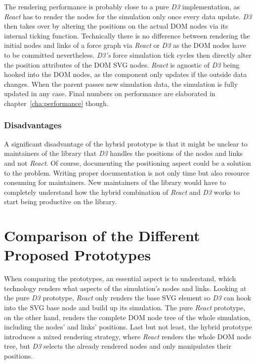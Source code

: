 The rendering performance is probably close to a pure \emph{D3} implementation, as \emph{React} has to render the nodes for the simulation only once every data update. \emph{D3} then takes over by altering the positions on the actual DOM nodes via its internal ticking function. Technically there is no difference between rendering the initial nodes and links of a force graph via \emph{React} or \emph{D3} as the DOM nodes have to be committed nevertheless. \emph{D3's} force simulation tick cycles then directly alter the position attributes of the DOM SVG nodes. \emph{React} is agnostic of \emph{D3} being hooked into the DOM nodes, as the component only updates if the outside data changes. When the parent passes new simulation data, the simulation is fully updated in any case. Final numbers on performance are elaborated in chapter~\ref{cha:performance} though.

\subsubsection{Disadvantages}
\label{subsub:hybridDisadvantages}

A sig\-nifi\-cant disadvantage of the hybrid prototype is that it might be unclear to maintainers of the library that \emph{D3} handles the positions of the nodes and links and not \emph{React}. Of course, documenting the positioning aspect could be a solution to the problem. Writing proper documentation is not only time but also resource consuming for maintainers. New maintainers of the library would have to completely understand how the hybrid combination of \emph{React} and \emph{D3} works to start being productive on the library.

\section{Comparison of the Different Proposed Prototypes}

When comparing the prototypes, an essential aspect is to understand, which technology renders what aspects of the simulation's nodes and links. Looking at the pure \emph{D3} prototype, \emph{React} only renders the base SVG element so \emph{D3} can hook into the SVG base node and build up its simulation. The pure \emph{React} prototype, on the other hand, renders the complete DOM node tree of the whole simulation, including the nodes' and links' positions. Last but not least, the hybrid prototype introduces a mixed rendering strategy, where \emph{React} renders the whole DOM node tree, but \emph{D3} selects the already rendered nodes and only manipulates their positions.

